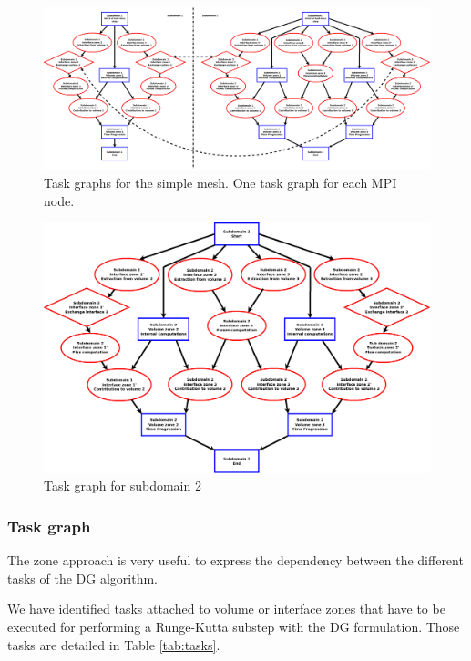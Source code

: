 \documentclass[preprint]{sig-alternate}
\begin{document}
%
\begin{figure}
  \centering
 \includegraphics[width=17cm]{graph_exemple}
  \caption{Task graphs for the simple mesh. One task graph for each MPI node.}
  \label{fig:mpi-task-graph}
\end{figure}

\begin{figure}
  \centering
\includegraphics[width=15cm]{graph_exemple_2}
  \caption{Task graph for subdomain 2}
  \label{fig:sub2-task-graph}
\end{figure}


\subsubsection{Task graph}
The zone approach is very useful to express the dependency between the different tasks of the DG algorithm.

We have identified tasks attached to volume or interface zones that have to be executed for performing a Runge-Kutta substep with the DG formulation. Those tasks are detailed in Table \ref{tab:tasks}.
\end{document}

